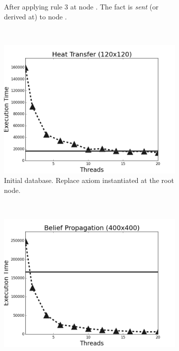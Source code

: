 \begin{figure}[h]
\begin{subfigure}[b]{0.5\textwidth}
                \caption{After applying rule 3 at node . The
                 fact is \emph{sent} (or derived at) to node
                .}

                \label{fig:implementation:scale_minmax}
        \end{subfigure}\\
        \begin{subfigure}[b]{0.5\textwidth}
                \includegraphics[width=\textwidth]{experiments/scalability/scale-new-heat-transfer-120.png}
                \caption{Initial database. Replace axiom instantiated at the
                    root node.}
                   \label{fig:implementation:scale_heat}
        \end{subfigure}%
        ~
        \begin{subfigure}[b]{0.5\textwidth}
                \includegraphics[width=\textwidth]{experiments/scalability/scale-belief-propagation-400.png}


\end{subfigure}
\end{figure}
